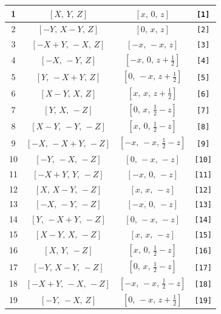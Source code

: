 \documentclass[fleqn,8pt]{jsarticle}
\begin{document}
\begin{longtable}{cccc}
1 & $\left[ X,\, Y,\, Z \right]$ & $\left[ x,\, 0,\, z \right]$ & {\tt [1]} \\ \hline
2 & $\left[ - Y,\, X - Y,\, Z \right]$ & $\left[ 0,\, x,\, z \right]$ & {\tt [2]} \\ \hline
3 & $\left[ - X + Y,\, - X,\, Z \right]$ & $\left[ - x,\, - x,\, z \right]$ & {\tt [3]} \\ \hline
4 & $\left[ - X,\, - Y,\, Z \right]$ & $\left[ - x,\, 0,\, z + \frac{1}{2} \right]$ & {\tt [4]} \\ \hline
5 & $\left[ Y,\, - X + Y,\, Z \right]$ & $\left[ 0,\, - x,\, z + \frac{1}{2} \right]$ & {\tt [5]} \\ \hline
6 & $\left[ X - Y,\, X,\, Z \right]$ & $\left[ x,\, x,\, z + \frac{1}{2} \right]$ & {\tt [6]} \\ \hline
7 & $\left[ Y,\, X,\, - Z \right]$ & $\left[ 0,\, x,\, \frac{1}{2} - z \right]$ & {\tt [7]} \\ \hline
8 & $\left[ X - Y,\, - Y,\, - Z \right]$ & $\left[ x,\, 0,\, \frac{1}{2} - z \right]$ & {\tt [8]} \\ \hline
9 & $\left[ - X,\, - X + Y,\, - Z \right]$ & $\left[ - x,\, - x,\, \frac{1}{2} - z \right]$ & {\tt [9]} \\ \hline
10 & $\left[ - Y,\, - X,\, - Z \right]$ & $\left[ 0,\, - x,\, - z \right]$ & {\tt [10]} \\ \hline
11 & $\left[ - X + Y,\, Y,\, - Z \right]$ & $\left[ - x,\, 0,\, - z \right]$ & {\tt [11]} \\ \hline
12 & $\left[ X,\, X - Y,\, - Z \right]$ & $\left[ x,\, x,\, - z \right]$ & {\tt [12]} \\ \hline
13 & $\left[ - X,\, - Y,\, - Z \right]$ & $\left[ - x,\, 0,\, - z \right]$ & {\tt [13]} \\ \hline
14 & $\left[ Y,\, - X + Y,\, - Z \right]$ & $\left[ 0,\, - x,\, - z \right]$ & {\tt [14]} \\ \hline
15 & $\left[ X - Y,\, X,\, - Z \right]$ & $\left[ x,\, x,\, - z \right]$ & {\tt [15]} \\ \hline
16 & $\left[ X,\, Y,\, - Z \right]$ & $\left[ x,\, 0,\, \frac{1}{2} - z \right]$ & {\tt [16]} \\ \hline
17 & $\left[ - Y,\, X - Y,\, - Z \right]$ & $\left[ 0,\, x,\, \frac{1}{2} - z \right]$ & {\tt [17]} \\ \hline
18 & $\left[ - X + Y,\, - X,\, - Z \right]$ & $\left[ - x,\, - x,\, \frac{1}{2} - z \right]$ & {\tt [18]} \\ \hline
19 & $\left[ - Y,\, - X,\, Z \right]$ & $\left[ 0,\, - x,\, z + \frac{1}{2} \right]$ & {\tt [19]} \\ \hline

\end{longtable}
\end{document}
